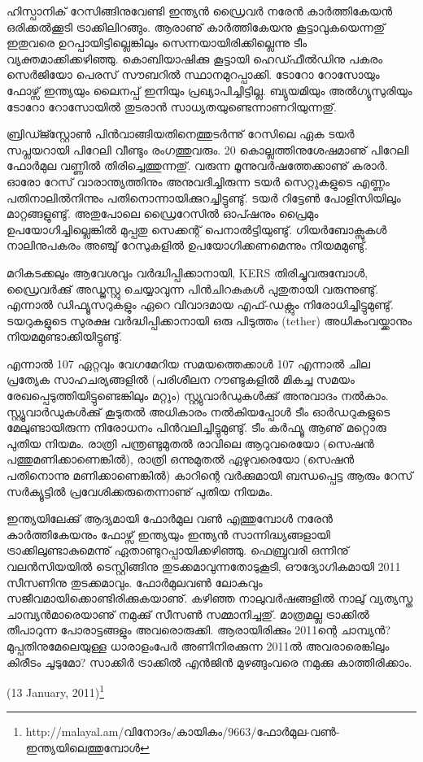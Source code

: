ഹിസ്പാനിക് റേസിങ്ങിനുവേണ്ടി ഇന്ത്യന്‍ ഡ്രൈവര്‍ നരേന്‍ കാര്‍ത്തികേയന്‍ ഒരിക്കല്‍ക്കൂടി ട്രാക്കിലിറങ്ങും. ആരാണു് 
കാര്‍ത്തികേയനു കൂട്ടാവുകയെന്നതു് ഇതുവരെ ഉറപ്പായിട്ടില്ലെങ്കിലും സെന്നയായിരിക്കില്ലെന്നു ടീം വ്യക്തമാക്കിക്കഴിഞ്ഞു. 
കൊബിയാഷിക്കു കൂട്ടായി ഹെഡ്ഫീല്‍ഡിനു പകരം സെര്‍ജിയോ പെരസ് സൗബറില്‍ സ്ഥാനമുറപ്പാക്കി. ടോറോ
 റോസോയും ഫോഴ്സ് ഇന്ത്യയും ലൈനപ്പ് ഇനിയും പ്രഖ്യാപിച്ചിട്ടില്ല. ബ്യുയമിയും അല്‍ഗ്യുസുരിയും ടോറോ റോസോയില്‍ 
തുടരാന്‍ സാധ്യതയുണ്ടെന്നാണറിയുന്നതു്.

ബ്രിഡ്ജ്സ്റ്റോണ്‍ പിന്‍വാങ്ങിയതിനെത്തുടര്‍ന്നു് റേസിലെ ഏക ടയര്‍ സപ്ലയറായി പിറേലി വീണ്ടും രംഗത്തുവരും. 20 
കൊല്ലത്തിനുശേഷമാണു് പിറേലി ഫോര്‍മുല വണ്ണില്‍ തിരിച്ചെത്തുന്നതു്. വരുന്ന മൂന്നുവര്‍ഷത്തേക്കാണു് കരാര്‍. ഓരോ
റേസ് വാരാന്ത്യത്തിനും അനുവദിച്ചിരുന്ന ടയര്‍ സെറ്റുകളുടെ എണ്ണം പതിനാലില്‍നിന്നും പതിനൊന്നായിക്കുറച്ചിട്ടുണ്ടു്. 
ടയര്‍ റിട്ടേണ്‍ പോളിസിയിലും മാറ്റങ്ങളുണ്ടു്. അതുപോലെ ഡ്രൈറേസില്‍ ഓപ്ഷനും പ്രൈമും 
ഉപയോഗിച്ചില്ലെങ്കില്‍ മുപ്പതു സെക്കന്റ് പെനാല്‍ട്ടിയുണ്ടു്. ഗിയര്‍ബോക്സുകള്‍ നാലിനുപകരം അഞ്ചു് റേസുകളില്‍ 
ഉപയോഗിക്കണമെന്നും നിയമമുണ്ടു്.

മറികടക്കലും ആവേശവും വര്‍ദ്ധിപ്പിക്കാനായി, KERS തിരിച്ചുവരുമ്പോള്‍, ഡ്രൈവര്‍ക്കു് അഡ്ജസ്റ്റു ചെയ്യാവുന്ന 
പിന്‍ചിറകുകള്‍ പുതുതായി വരുന്നുണ്ടു്. എന്നാല്‍ ഡിഫ്യൂസറുകളും ഏറെ വിവാദമായ എഫ്-ഡക്റ്റും നിരോധിച്ചിട്ടുമുണ്ടു്. 
ടയറുകളുടെ സുരക്ഷ വര്‍ദ്ധിപ്പിക്കാനായി ഒരു പിടുത്തം (tether) അധികംവയ്ക്കാനും നിയമമുണ്ടാക്കിയിട്ടുണ്ടു്.

എന്നാല്‍ 107%
ഏറ്റവും വേഗമേറിയ സമയത്തെക്കാള്‍ 107%
എന്നാല്‍ ചില പ്രത്യേക സാഹചര്യങ്ങളില്‍ (പരിശീലന റൗണ്ടുകളില്‍ മികച്ച സമയം രേഖപ്പെടുത്തിയിട്ടുണ്ടെങ്കിലും മറ്റും) 
സ്റ്റ്യുവാര്‍ഡുകള്‍ക്കു് അനുവാദം നല്‍കാം. സ്റ്റ്യൂവാര്‍ഡുകള്‍ക്കു് കൂടുതല്‍ അധികാരം നല്‍കിയപ്പോള്‍ ടീം ഓര്‍ഡറുകളുടെ 
മേലുണ്ടായിരുന്ന നിരോധനം പിന്‍വലിച്ചിട്ടുമുണ്ടു്. ടീം കര്‍ഫ്യൂ ആണു് മറ്റൊരു പുതിയ നിയമം. രാത്രി പന്ത്രണ്ടുമുതല്‍ 
രാവിലെ ആറുവരെയോ (സെഷന്‍ പത്തുമണിക്കാണെങ്കില്‍), രാത്രി ഒന്നുമുതല്‍ ഏഴുവരെയോ (സെഷന്‍ പതിനൊന്നു 
മണിക്കാണെങ്കില്‍) കാറിന്റെ വര്‍ക്കുമായി ബന്ധപ്പെട്ട ആരും റേസ് സര്‍ക്യൂട്ടില്‍ പ്രവേശിക്കരുതെന്നാണു് പുതിയ നിയമം.

ഇന്ത്യയിലേക്കു് ആദ്യമായി ഫോര്‍മുല വണ്‍ എത്തുമ്പോള്‍ നരേന്‍ കാര്‍ത്തികേയനും ഫോഴ്സ് ഇന്ത്യയും ഇന്ത്യന്‍ 
സാന്നിദ്ധ്യങ്ങളായി ട്രാക്കിലുണ്ടാകുമെന്നു് ഏതാണ്ടുറപ്പായിക്കഴിഞ്ഞു. ഫെബ്രുവരി ഒന്നിനു് വലന്‍സിയയില്‍ ടെസ്റ്റിങ്ങിനു 
തുടക്കമാവുന്നതോടുകൂടി, ഔദ്യോഗികമായി 2011 സീസണിനു തുടക്കമാവും. ഫോര്‍മുലവണ്‍ ലോകവും 
സജീവമായിക്കൊണ്ടിരിക്കുകയാണു്. കഴിഞ്ഞ നാലുവര്‍ഷങ്ങളില്‍ നാലു് വ്യത്യസ്ത ചാമ്പ്യന്‍മാരെയാണു് നമുക്കു് 
സീസണ്‍ സമ്മാനിച്ചതു്. മാത്രമല്ല ട്രാക്കില്‍ തീപാറുന്ന പോരാട്ടങ്ങളും അവരൊരുക്കി. ആരായിരിക്കും 2011ന്റെ ചാമ്പ്യന്‍? 
മുപ്പതിനുമേലെയുള്ള ധാരാളംപേര്‍ അണിനിരക്കുന്ന 2011ല്‍ അവരാരെങ്കിലും കിരീടം ചൂടുമോ? സാക്കിര്‍ ട്രാക്കില്‍ 
എന്‍ജിന്‍ മുഴങ്ങുംവരെ നമുക്കു കാത്തിരിക്കാം.

\begin{flushright}(13 January, 2011)\footnote{http://malayal.am/വിനോദം/കായികം/9663/ഫോര്‍മുല-വണ്‍-ഇന്ത്യയിലെത്തുമ്പോള്‍}\end{flushright}

\newpage
